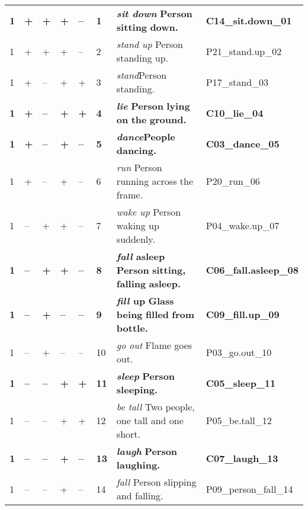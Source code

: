 \begin{tabular}{llllllp{3cm}l}
\midrule
\textbf{1} 	& \textbf{+} 	& \textbf{+} 	& \textbf{+} 	& \textbf{--} 	& \textbf{1} 	&\textbf{\textit{sit down}} \textbf{Person} \textbf{sitting} \textbf{down.} 	& \textbf{C14\_sit.down\_01} \\
1 		& + 		& + 		& + 		& -- 		& 2 		&\textit{stand up} Person standing up. 						& P21\_stand.up\_02  \\
1 		& + 		& -- 		& + 		& + 		& 3 		&\textit{stand}\textbf{\textit{}}Person standing.				& P17\_stand\_03  \\
\textbf{1} 	& \textbf{+} 	& \textbf{--} & \textbf{+} 	& \textbf{+} & \textbf{4} 	&\textbf{\textit{lie}} \textbf{Person} \textbf{lying} \textbf{on} \textbf{the} \textbf{ground.} & \textbf{C10\_lie\_04}  \\
\textbf{1} 	& \textbf{+} 	& \textbf{--} & \textbf{+} 	& \textbf{--} 	& \textbf{5} 	&\textbf{\textit{dance}}\textbf{\textit{}}\textbf{People} \textbf{dancing.} & \textbf{C03\_dance\_05} \\
1 		& + 		& -- 		& + 		& -- 		& 6 		&\textit{run} Person running across the frame.					&  P20\_run\_06  \\
1 		& -- 	& + 		& + 		& -- 		& 7 		&\textit{wake up} Person waking up suddenly.					&  P04\_wake.up\_07  \\
\textbf{1} 	& \textbf{--}& \textbf{+} & \textbf{+} 	& \textbf{--} 	& \textbf{8} 	&\textbf{\textit{fall} \textbf{asleep}} \textbf{Person} \textbf{sitting,} \textbf{falling} \textbf{asleep.}&  \textbf{C06\_fall.asleep\_08}  \\
\textbf{1} 	& \textbf{--}& \textbf{+} & \textbf{--}& \textbf{--} 	& \textbf{9} 	&\textbf{\textit{fill} \textbf{up}} \textbf{Glass} \textbf{being} \textbf{filled} \textbf{from} \textbf{bottle.} & \textbf{C09\_fill.up\_09} \\
1 		& -- 	& + 		& --		& -- 		& 10 		&\textit{go out} Flame goes out. 						& P03\_go.out\_10  \\
\textbf{1} 	& \textbf{--}& \textbf{--} & \textbf{+} & \textbf{+} & \textbf{11} 	&\textbf{\textit{sleep}} \textbf{Person} \textbf{sleeping.} 			& \textbf{C05\_sleep\_11} \\
1 		& -- 	& -- 		& + 		& + 		& 12 		&\textit{be tall} Two people, one tall and one short. 				& P05\_be.tall\_12 \\
\textbf{1} 	& \textbf{--}& \textbf{--} & \textbf{+} & \textbf{--} 	& \textbf{13} 	&\textbf{\textit{laugh}} \textbf{Person} \textbf{laughing.}			 & \textbf{C07\_laugh\_13} \\
1 		& -- 	& -- 		& + 		& -- 		& 14 		&\textit{fall} Person slipping and falling. 					& P09\_person\_fall\_14 \\

\end{tabular}
